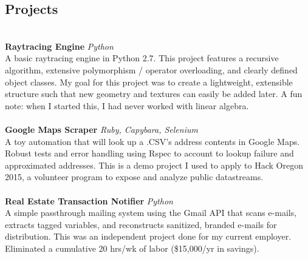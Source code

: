 \documentclass[11pt,line,centered]{res}
\begin{document}
\begin{resume}
    \section{\sectionfont\normalsize Projects}\\
    \vspace{1em}
        {\bfseries\footnotesize Raytracing Engine} \hfill \textit{Python}\\
            A basic raytracing engine in Python 2.7. This project features a recursive algorithm, extensive polymorphism / operator overloading, and clearly defined object classes. My goal for this project was to create a lightweight, extensible structure such that new geometry and textures can easily be added later. A fun note: when I started this, I had never worked with linear algebra.\\
        \vspace{2mm}\\
        {\bfseries\footnotesize Google Maps Scraper} \hfill \textit{Ruby, Capybara, Selenium}\\
            A toy automation that will look up a .CSV's address contents in Google Maps. Robust tests and error handling using Rspec to account to lookup failure and approximated addresses. This is a demo project I used to apply to Hack Oregon 2015, a volunteer program to expose and analyze public datastreams.\\
        \vspace{2mm}\\
        {\bfseries\footnotesize Real Estate Transaction Notifier} \hfill \textit{Python}\\
            A simple passthrough mailing system using the Gmail API that scans e-mails, extracts tagged variables, and reconstructs sanitized, branded e-mails for distribution. This was an independent project done for my current employer. Eliminated a cumulative 20 hrs/wk of labor (\$15,000/yr in savings).\\


\end{resume}
\end{document}
